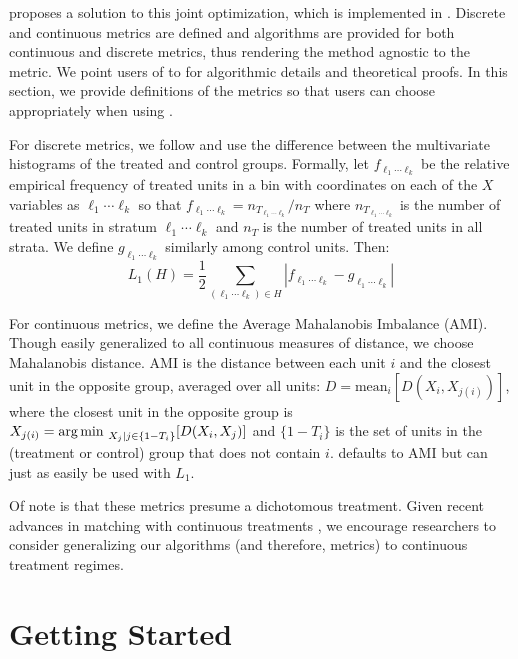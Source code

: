 \documentclass[nojss]{jss}
\newcommand{\argmin}{\operatornamewithlimits{arg\,min\ }}
\newcommand{\mean}{\text{mean}}
\begin{document}
\citet{kingND} proposes a solution to this joint optimization, which
is implemented in . Discrete and continuous
metrics are defined and algorithms are provided for both continuous
and discrete metrics, thus rendering the method agnostic to the
metric. We point users of  to \citet{kingND} for
algorithmic details and theoretical proofs. In this section, we
provide definitions of the metrics so that users can choose
appropriately when using .

For discrete metrics, we follow \citep{iacus2011b} and use the
difference between the multivariate histograms of the treated and
control groups. Formally, let $f_{\ell_1\cdots \ell_k}$ be the
relative empirical frequency of treated units in a bin with
coordinates on each of the $X$ variables as $\ell_1\cdots \ell_k$ so
that $f_{\ell_1\cdots \ell_k}=n_{T_{\ell_1\cdots \ell_k}}/n_T$ where
$n_{T_{\ell_1\cdots \ell_k}}$ is the number of treated units in
stratum $\ell_1\cdots \ell_k$ and $n_T$ is the number of treated units
in all strata. We define $g_{\ell_1\cdots \ell_k}$ similarly among
control units. Then:
\begin{equation}\label{eq:L1} 
  L_1(H) =\frac{1}{2} \sum_{(\ell_1
    \cdots \ell_k) \in H} |f_{\ell_1\cdots \ell_k} - g_{\ell_1\cdots
    \ell_k}| 
\end{equation} 

For continuous metrics, we define the Average Mahalanobis Imbalance
(AMI). Though easily generalized to all continuous measures of
distance, we choose Mahalanobis distance. AMI is the distance between
each unit $i$ and the closest unit in the opposite group, averaged
over all units: $D=\mean_i [D(X_i,X_{j(i)})]$, where the closest unit
in the opposite group is
$X_{j(i)}=\argmin_{X_j|j\in\{1-T_i\}}[D(X_i,X_j)]$ and $\{1-T_i\}$ is
the set of units in the (treatment or control) group that does not
contain $i$.  defaults to AMI but can just as
easily be used with $L_1$.

Of note is that these metrics presume a dichotomous treatment.  Given
recent advances in matching with continuous treatments \citep{iacusND,
  ratkovicND}, we encourage researchers to consider generalizing our
algorithms (and therefore, metrics) to continuous treatment regimes.

\section[Getting Started]{Getting Started}
\end{document}
